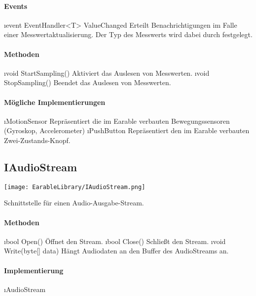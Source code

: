 \documentclass[../entwurf.tex]{subfiles}
\begin{document}
\paragraph{Events}
\begin{itemize}
	\i{event EventHandler<T> ValueChanged} Erteilt Benachrichtigungen im Falle einer Messwertaktualisierung. Der Typ des Messwerts wird dabei durch  festgelegt.
\end{itemize}
\paragraph{Methoden}
\begin{itemize}
	\i{void StartSampling()} Aktiviert das Auslesen von Messwerten.
	\i{void StopSampling()} Beendet das Auslesen von Messwerten.
\end{itemize}
\paragraph{Mögliche Implementierungen}
\begin{itemize}
	\i{MotionSensor} Repräsentiert die im Earable verbauten Bewegungssensoren (Gyroskop, Accelerometer)
	\i{PushButton} Repräsentiert den im Earable verbauten Zwei-Zustands-Knopf.
\end{itemize}

\subsection{IAudioStream}
\begin{center}
	\texttt{[image: EarableLibrary/IAudioStream.png]}
\end{center}
Schnittstelle für einen Audio-Ausgabe-Stream.
\paragraph{Methoden}
\begin{itemize}
	\i{bool Open()} Öffnet den Stream.
	\i{bool Close()} Schließt den Stream.
	\i{void Write(byte[] data)} Hängt Audiodaten an den Buffer des AudioStreams an.
\end{itemize}
\paragraph{Implementierung}
\begin{itemize}
	\i{AudioStream}
\end{itemize}
\end{document}
